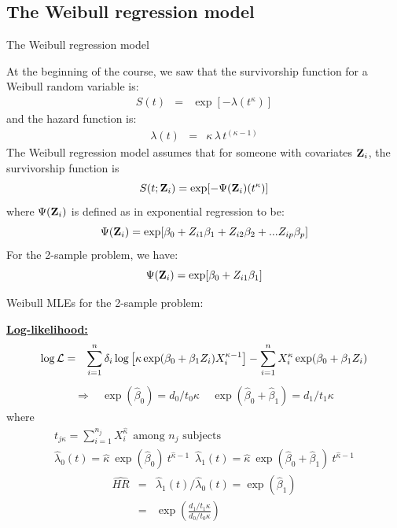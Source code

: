 \documentclass[envcountsect, 10pt, portrait, palatino]{beamer}
\newcommand{\bfZ}{{\mbox{{\bf Z}}}}
\begin{document}
\subsection{The Weibull regression model}
\begin{frame}{The Weibull regression model}

At the beginning of the course, we saw that the survivorship function
for a Weibull random variable is:
\begin{eqnarray*}
 S(t) & = & \exp[- \lambda ( t^\kappa) ]
\end{eqnarray*}
and the hazard function is:
\begin{eqnarray*}
 \lambda(t) & = & \kappa \, \lambda \, t^{(\kappa-1)}
\end{eqnarray*}
The Weibull regression model assumes that for someone with
covariates ${\bfZ_i}$, the survivorship function is
\[  S(t; {\bfZ_i} ) = \exp[- \Psi(\bfZ_i)  ( t^\kappa) ] \]
where $\Psi(\bfZ_i)$ is defined as in exponential regression to be:
\[  \Psi(\bfZ_i)  = \exp[ \beta_0 +
      Z_{i1}  \beta_1 +  Z_{i2}  \beta_2  + ... Z_{ip}
    \beta_p] \]
For the 2-sample problem, we have:
\[  \Psi(\bfZ_i)  = \exp[ \beta_0 + Z_{i1}  \beta_1] \]
\end{frame} 
\begin{frame}{Weibull MLEs for the 2-sample problem:}

\underline{\bf Log-likelihood:}
\begin{eqnarray*}
\log {\cal L} & = &  \sum_{i=1}^{n} {\delta_i}
\log\left[\kappa \exp(\beta_0 + \beta_1 Z_i) X_i^{\kappa-1}\right] -
\sum_{i=1}^{n} X_i^{\kappa} \exp(\beta_0 +\beta_1 Z_i)
\end{eqnarray*}
\begin{eqnarray*}
\Rightarrow ~~~~ \exp(\hat\beta_0)  =  d_0/t_{0}\kappa ~~~~~
\exp(\hat\beta_0 + \hat\beta_1) = d_1/t_{1}\kappa
\end{eqnarray*}
where
\begin{eqnarray*}
t_{j\kappa}  =  \sum_{i=1}^{n_j} X_i^{\hat\kappa}
~~\mbox{among $n_j$ subjects}\\
\hat\lambda_0(t) = \hat\kappa ~\exp(\hat\beta_0) ~t^{\hat\kappa-1} \,\,\,
\hat\lambda_1(t) = \hat\kappa ~\exp(\hat\beta_0+\hat\beta_1)
~t^{\hat\kappa-1}
\end{eqnarray*}
\begin{eqnarray*}
     \widehat{HR} & = & \hat\lambda_1(t)/\hat\lambda_0(t)
= \exp(\hat\beta_1) \\
                  & = & \exp\left(\frac{d_1/t_{1}\kappa}
                       {d_0/t_{0}\kappa}\right)
\end{eqnarray*}
\end{frame} 
\end{document}
